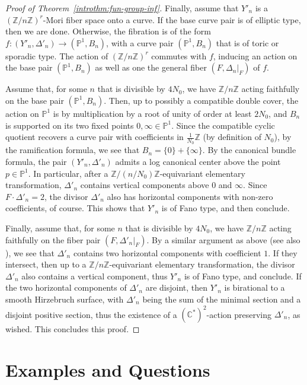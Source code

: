 \documentclass{amsart}
\newcommand{\pp}{\mathbb{P}}
\newcommand{\zz}{\mathbb{Z}}
\newcommand{\cc}{\mathbb{C}}
\theoremstyle{definition}
\theoremstyle{remark}
\numberwithin{equation}{section}
\begin{document}
\begin{proof}[Proof of Theorem~\ref{introthm:fun-group-inf}]
 
Finally, assume that $Y'_n$ is a $(\zz/n\zz)^r$-Mori fiber space onto a curve. If the base curve pair is of elliptic type, then we are done. Otherwise, the fibration is of the form $f:(Y'_n,\Delta'_n)\to (\pp^1,B_n)$, with a curve pair $(\pp^1,B_n)$ that is of toric or sporadic type. The action of $(\zz/n\zz)^r$ commutes with $f$, inducing an action on the base pair $(\pp^1,B_n)$ as well as one the general fiber $(F,\Delta_n|_F)$ of $f$.



Assume that, for some $n$ that is divisible by $4N_0$, we have $\zz/n\zz$ acting faithfully on the base pair $(\pp^1,B_n)$. Then, up to possibly a compatible double cover, the action on $\pp^1$ is by multiplication by a root of unity of order at least $2N_0$, and $B_n$ is supported on its two fixed points $0,\infty\in\pp^1$. Since the compatible cyclic quotient recovers a curve pair with coefficients in $\frac{1}{N_0}\zz$ (by definition of $N_0$), by the ramification formula, we see that $B_n=\{0\}+\{\infty\}$. By the canonical bundle formula, the pair $(Y'_n,\Delta'_n)$ admits a log canonical center above the point $p\in\pp^1$. In particular, after a $\zz/(n/N_0)\zz$-equivariant elementary transformation, $\Delta'_n$ contains vertical components above $0$ and $\infty$. Since $F\cdot \Delta'_n = 2$, the divisor $\Delta'_n$ also has horizontal components with non-zero coefficients, of course. This shows that $Y'_n$ is of Fano type, and then \cite[Theorems 3.1 and 3.2]{Mor20b} conclude.


Finally, assume that, for some $n$ that is divisible by $4N_0$, we have $\zz/n\zz$ acting faithfully on the fiber pair $(F,\Delta'_n|_F)$. By a similar argument as above (see also \cite[Proof of Proposition 2.24]{Mor20b}), we see that $\Delta'_n$ contains two horizontal components with coefficient $1$. If they intersect, then up to a $\zz/n\zz$-equivariant elementary transformation, the divisor $\Delta'_n$ also contains a vertical component, thus $Y'_n$ is of Fano type, and \cite[Theorems 3.1 and 3.2]{Mor20b} conclude. If the two horizontal components of $\Delta'_n$ are disjoint, then $Y'_n$ is birational to a smooth Hirzebruch surface, with $\Delta'_n$ being the sum of the minimal section and a disjoint positive section, thus the existence of a $(\cc^*)^2$-action preserving $\Delta'_n$, as wished. This concludes this proof.
\end{proof}

\section{Examples and Questions}
\end{document}
